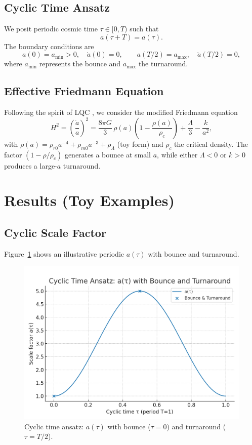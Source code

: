 \documentclass[12pt]{article}
\begin{document}
\subsection{Cyclic Time Ansatz}
We posit periodic cosmic time $\tau \in [0,T)$ such that
\[
a(\tau+T) = a(\tau).
\]
The boundary conditions are
\begin{equation}
a(0)=a_{\min}>0, \quad \dot a(0)=0, \qquad a(T/2)=a_{\max}, \quad \dot a(T/2)=0,
\end{equation}
where $a_{\min}$ represents the bounce and $a_{\max}$ the turnaround.

\subsection{Effective Friedmann Equation}
Following the spirit of LQC \cite{Ashtekar2006}, we consider the modified Friedmann equation
\begin{equation}
H^2 = \left(\frac{\dot a}{a}\right)^2 = \frac{8\pi G}{3}\,\rho(a)\left(1 - \frac{\rho(a)}{\rho_c}\right)
+ \frac{\Lambda}{3} - \frac{k}{a^2},
\end{equation}
with $\rho(a)=\rho_{r0}a^{-4}+\rho_{m0}a^{-3}+\rho_\Lambda$ (toy form) and $\rho_c$ the critical density. 
The factor $(1-\rho/\rho_c)$ generates a bounce at small $a$, while either $\Lambda<0$ or $k>0$ produces 
a large-$a$ turnaround.

\section{Results (Toy Examples)}
\subsection{Cyclic Scale Factor}
Figure~\ref{fig:atau} shows an illustrative periodic $a(\tau)$ with bounce and turnaround.

\begin{figure}[h]
\centering
\includegraphics[width=0.7\linewidth]{figures/plot_a_tau.png}
\caption{Cyclic time ansatz: $a(\tau)$ with bounce ($\tau=0$) and turnaround ($\tau=T/2$).}
\label{fig:atau}
\end{figure}
\end{document}
